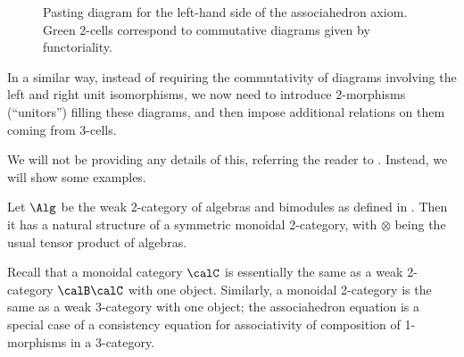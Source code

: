 \begin{figure}[ht]
\begin{center}
	\end{center}
	\caption{Pasting diagram for the left-hand side of the associahedron axiom.
    Green 2-cells correspond to commutative diagrams given by functoriality.}
	\label{f: associahedron}
\end{figure}

In a similar way, instead of requiring the commutativity of diagrams involving
the left and right unit isomorphisms, we now need to introduce 2-morphisms
(``unitors'') filling these diagrams, and then impose additional relations on
them coming from 3-cells.

We will not be providing any details of this, referring the reader to
. Instead, we will show some examples.


\begin{example}\label{x:alg-bimodules}
  Let $\Alg$ be the weak 2-category of algebras and bimodules as defined in
  . Then it has a natural structure of a symmetric monoidal
  2-category, with $\otimes$ being the usual tensor product of algebras.
\end{example}

\begin{remark}
  Recall that a monoidal category $\calC$ is essentially the same as a
  weak 2-category $\calB\calC$ with one object. Similarly, a monoidal
  2-category is the same as a weak 3-category with one object; the
  associahedron equation is a special case of a consistency equation for
  associativity of composition of 1-morphisms in a 3-category.
\end{remark}


